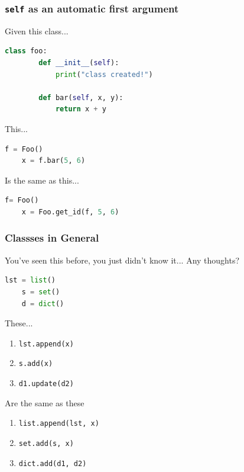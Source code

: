 \documentclass{beamer}
\begin{document}
%
%
\begin{frame}[fragile]
	\frametitle{\lstinline|self| as an automatic first argument}
	Given this class...\\
	\vfill
	\begin{lstlisting}[language=python, autogobble]
	class foo:
		def __init__(self):
			print("class created!")

		def bar(self, x, y):
			return x + y
	\end{lstlisting}
	\vspace{0.5cm}
	This...
	\vfill
	\begin{lstlisting}[language=python, autogobble]
	f = Foo()
	x = f.bar(5, 6)
	\end{lstlisting}
	\vspace{0.5cm}
	Is the same as this...\\
	\vfill
	\begin{lstlisting}[language=python, autogobble]
	f= Foo()
	x = Foo.get_id(f, 5, 6)
	\end{lstlisting}
\end{frame}

%
%
\begin{frame}[fragile]
	\frametitle{Classses in General}
	You've seen this before, you just didn't know it... Any thoughts?
	\begin{lstlisting}[language=python, autogobble]
	lst = list()
	s = set()
	d = dict()
	\end{lstlisting}
	\vfill
	\begin{minipage}{0.49\textwidth}
		These...
		\begin{enumerate}
			\item \lstinline|lst.append(x)|
			\item \lstinline|s.add(x)|
			\item \lstinline|d1.update(d2)|
		\end{enumerate}
	\end{minipage}
	\hfill
	\begin{minipage}{0.49\textwidth}
		Are the same as these
		\begin{enumerate}
			\item \lstinline|list.append(lst, x)|
			\item \lstinline|set.add(s, x)|
			\item \lstinline|dict.add(d1, d2)|
		\end{enumerate}
	\end{minipage}
\end{frame}
\end{document}
